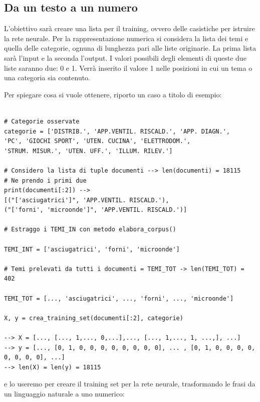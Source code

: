 \documentclass[10pt,a4paper]{report}
\begin{document}
\subsection*{Da un testo a un numero}

L'obiettivo sarà creare una lista per il training, ovvero delle casistiche per istruire la rete neurale. 
Per la rappresentazione numerica si considera la lista dei temi e quella delle categorie, ognuna di lunghezza pari alle liste originarie. La prima lista sarà l'input e la seconda l'output. I valori possibili degli elementi di queste due liste saranno due: 0 e 1. Verrà inserito il valore 1 nelle posizioni in cui un tema o una categoria sia contenuto. 

Per spiegare cosa si vuole ottenere, riporto un caso a titolo di esempio:
\begin{verbatim}

# Categorie osservate
categorie = ['DISTRIB.', 'APP.VENTIL. RISCALD.', 'APP. DIAGN.', 
'PC', 'GIOCHI SPORT', 'UTEN. CUCINA', 'ELETTRODOM.', 
'STRUM. MISUR.', 'UTEN. UFF.', 'ILLUM. RILEV.']

# Considero la lista di tuple documenti --> len(documenti) = 18115
# Ne prendo i primi due
print(documenti[:2]) -->
[("['asciugatrici']", 'APP.VENTIL. RISCALD.'), 
("['forni', 'microonde']", 'APP.VENTIL. RISCALD.')]

# Estraggo i TEMI_IN con metodo elabora_corpus()

TEMI_INT = ['asciugatrici', 'forni', 'microonde']

# Temi prelevati da tutti i documenti = TEMI_TOT -> len(TEMI_TOT) = 402

TEMI_TOT = [..., 'asciugatrici', ..., 'forni', ..., 'microonde']

X, y = crea_training_set(documenti[:2], categorie)

--> X = [..., [..., 1,..., 0,...],..., [..., 1,..., 1, ...,], ...]
--> y = [..., [0, 1, 0, 0, 0, 0, 0, 0, 0, 0], ... , [0, 1, 0, 0, 0, 0, 0, 0, 0, 0], ...]
--> len(X) = len(y) = 18115
\end{verbatim}
e lo useremo per creare il training set per la rete neurale, trasformando le frasi da un linguaggio naturale a uno numerico:
\end{document}
